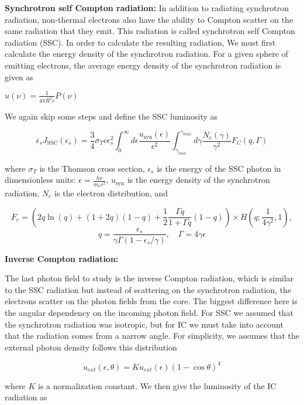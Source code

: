 \textbf{Synchrotron self Compton radiation:}
In addition to radiating synchrotron radiation, non-thermal electrons also have the ability to Compton scatter on the same radiation that they emit. This radiation is called synchrotron self Compton radiation (SSC). In order to calculate the resulting radiation, We must first calculate the energy density of the synchrotron radiation. For a given sphere of emitting electrons, the average energy density of the synchrotron radiation is given as

$ u(\nu) = \frac{1}{4 \pi R^2 c} P(\nu) $
    
We again skip some steps and define the SSC luminosity as

\begin{equation}    
\epsilon_s J_{\text{SSC}}(\epsilon_s) =  \frac{3}{4} \sigma_T c \epsilon_s^2 \int_0^{\infty} d\epsilon \frac{u_{\text{syn}}(\epsilon)}{\epsilon^2} \int_{\gamma_{min}}^{\gamma_{max}} d\gamma \frac{N_e(\gamma)}{\gamma^2} F_C(q,\Gamma)
\end{equation}

where $\sigma_T$ is the Thomson cross section, $\epsilon_s$ is the energy of the SSC photon in dimensionless units: $\epsilon = \frac{h\nu}{m_e c^2}$, $u_{\text{syn}}$ is the energy density of the synchrotron radiation, $N_e$ is the electron distribution, and 

$$
F_c = \left(2q\ln (q) + (1+2q)(1-q) + \frac{1}{2}\frac{\Gamma q}{1+ \Gamma q}(1-q)\right)\times H\left(q; \frac{1}{4\gamma^2},1\right),
$$
$$
q = \frac{\epsilon_s}{\gamma \Gamma(1-\epsilon_s/\gamma)}, \quad \Gamma = 4\gamma \epsilon
$$

\textbf{Inverse Compton radiation:}

The last photon field to study is the inverse Compton radiation, which is similar to the SSC radiation but instead of scattering on the synchrotron radiation, the electrons scatter on the photon fields from the core. The biggest difference here is the angular dependency on the incoming photon field. For SSC we assumed that the synchrotron radiation was isotropic, but for IC we must take into account that the radiation comes from a narrow angle. For simplicity, we assumes that the external photon density follows this distribution 

\begin{equation}
    u_{ext}(\epsilon,\theta) = K u_{ext}(\epsilon)(1-\cos \theta)^4  
\end{equation}

where $K$ is a normalization constant. We then give the luminosity of the IC radiation as

